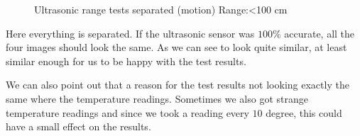 \begin{figure}[!h]
    \centering
    \qquad
    \caption{Ultrasonic range tests separated (motion) Range:<100 cm}%
    \label{fig:test45}%
\end{figure} 

Here everything is separated. If the ultrasonic sensor was $100\%$ accurate, all the four images should look the same. As we can see to look quite similar, at least similar enough for us to be happy with the test results. 

We can also point out that a reason for the test results not looking exactly the same where the temperature readings. Sometimes we also got strange temperature readings and since we took a reading every $10$ degree, this could have a small effect on the results.
